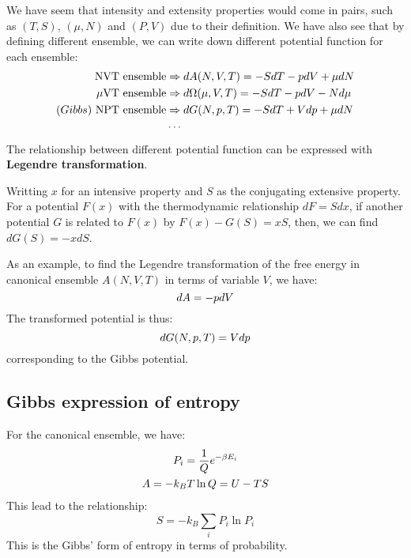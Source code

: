 \documentclass{article}
\begin{document}
We have seem that intensity and extensity properties would come in pairs, such as $(T,S)$, $(\mu,N)$
and $(P,V)$ due to their definition. We have also see that by defining different ensemble, we can
write down different potential function for each ensemble:
\begin{align}
    \text{NVT ensemble} &\Rightarrow dA(N,V,T) = -SdT - pdV + \mu dN\notag \\
    \text{$\mu$VT ensemble} &\Rightarrow d\Omega(\mu,V,T) = -SdT - pdV - Nd\mu \notag \\
    (Gibbs)\ \text{NPT ensemble} &\Rightarrow dG(N,p,T) = -SdT + Vdp + \mu dN \notag \\
    &\cdots \notag
\end{align}
The relationship between different potential function can be expressed with \textbf{Legendre transformation}.

Writting $x$ for an intensive property and $S$ as the conjugating extensive property. For a potential $F(x)$
with the thermodynamic relationship $dF = Sdx$, if another potential $G$ is related to $F(x)$ by $F(x) - G(S) = xS$,
then, we can find $dG(S) = -xdS$.

As an example, to find the Legendre transformation of the free energy in canonical ensemble $A(N,V,T)$ in terms of 
variable $V$, we have:
\begin{equation}
    dA = -pdV \notag
\end{equation} 
The transformed potential is thus:
\begin{equation}
    dG(N,p,T) = Vdp \notag
\end{equation} 
corresponding to the 
Gibbs potential. 

\subsection{Gibbs expression of entropy}
For the canonical ensemble, we have:
\begin{gather}
    P_i = \frac{1}{Q} e^{-\beta E_i} \notag \\
    A = -k_B T\ln Q = U - TS \notag
\end{gather}
This lead to the relationship:
\begin{equation}
    S = -k_B \sum_i P_i \ln P_i
\end{equation}
This is the Gibbs' form of entropy in terms of probability.

\pagebreak
\end{document}
